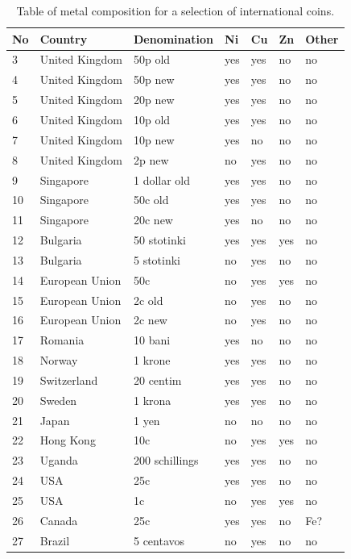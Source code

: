 \documentclass[11pt,a4paper,twoside,onecolumn]{article}
\begin{document}
\begin{table}[!htbp]
    \centering
    \begin{tabular}{@{}lllllll@{}}
    \toprule
    No & Country        & Denomination   & Ni  & Cu  & Zn  & Other \\ \midrule
    3  & United Kingdom & 50p old        & yes & yes & no  & no    \\
    4  & United Kingdom & 50p new        & yes & yes & no  & no    \\
    5  & United Kingdom & 20p new        & yes & yes & no  & no    \\
    6  & United Kingdom & 10p old        & yes & yes & no  & no    \\
    7  & United Kingdom & 10p new        & yes & no  & no  & no    \\
    8  & United Kingdom & 2p new         & no  & yes & no  & no    \\
    9  & Singapore      & 1 dollar old   & yes & yes & no  & no    \\
    10 & Singapore      & 50c old        & yes & yes & no  & no    \\
    11 & Singapore      & 20c new        & yes & no  & no  & no    \\
    12 & Bulgaria       & 50 stotinki    & yes & yes & yes & no    \\
    13 & Bulgaria       & 5 stotinki     & no  & yes & no  & no    \\
    14 & European Union & 50c            & no  & yes & yes & no    \\
    15 & European Union & 2c old         & no  & yes & no  & no    \\
    16 & European Union & 2c new         & no  & yes & no  & no    \\
    17 & Romania        & 10 bani        & yes & no  & no  & no    \\
    18 & Norway         & 1 krone        & yes & yes & no  & no    \\
    19 & Switzerland    & 20 centim      & yes & yes & no  & no    \\
    20 & Sweden         & 1 krona        & yes & yes & no  & no    \\
    21 & Japan          & 1 yen          & no  & no  & no  & no    \\
    22 & Hong Kong      & 10c            & no  & yes & yes & no    \\
    23 & Uganda         & 200 schillings & yes & yes & no  & no    \\
    24 & USA            & 25c            & yes & yes & no  & no    \\
    25 & USA            & 1c             & no  & yes & yes & no    \\
    26 & Canada         & 25c            & yes & yes & no  & Fe?   \\
    27 & Brazil         & 5 centavos     & no  & yes & no  & no    \\ \bottomrule
    \end{tabular}
    \caption{Table of metal composition for a selection of international coins.}
    \label{tab:coin-measured}
\end{table}
\end{document}
